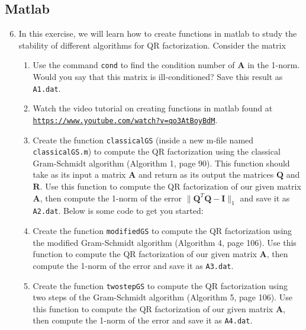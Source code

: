 \documentclass{article}
\begin{document}
\subsection*{Matlab}

\begin{enumerate}\setcounter{enumi}{5}
\item In this exercise, we will learn how to create functions in matlab to study the stability of different algorithms for QR factorization. Consider the matrix
	\begin{enumerate}
\[ \mathbf{A} = \begin{bmatrix} 1 & 1 & 1 & 1 & 1 \\ \epsilon & \epsilon & 0 & 0 & 0 \\ \epsilon & 0 & \epsilon & 0 & 0 \\ \epsilon & 0 & 0 & \epsilon & 0 \\ \epsilon & 0 & 0 & 0 & \epsilon \end{bmatrix} \quad \text{with} \quad \epsilon = 10^{-6}. \]
	\item Use the command {\tt cond} to find the condition number of $\mathbf{A}$ in the 1-norm. Would you say that this matrix is ill-conditioned? Save this result as {\tt A1.dat}.
	\item Watch the video tutorial on creating functions in matlab found at \\ {\tt \href{https://www.youtube.com/watch?v=qo3AtBoyBdM}{https://www.youtube.com/watch?v=qo3AtBoyBdM}}.
	\item Create the function {\tt classicalGS} (inside a new m-file named {\tt classicalGS.m}) to compute the QR factorization using the classical Gram-Schmidt algorithm (Algorithm 1, page 90). This function should take as its input a matrix $\mathbf{A}$ and return as its output the matrices $\mathbf{Q}$ and $\mathbf{R}$. Use this function to compute the QR factorization of our given matrix $\mathbf{A}$, then compute the 1-norm of the error $\| \mathbf{Q}^T\mathbf{Q} - \mathbf{I} \|_1$ and save it as {\tt A2.dat}. Below is some code to get you started:
	\item Create the function {\tt modifiedGS} to compute the QR factorization using the modified Gram-Schmidt algorithm (Algorithm 4, page 106). Use this function to compute the QR factorization of our given matrix $\mathbf{A}$, then compute the 1-norm of the error and save it as {\tt A3.dat}. 
	\item Create the function {\tt twostepGS} to compute the QR factorization using two steps of the Gram-Schmidt algorithm (Algorithm 5, page 106). Use this function to compute the QR factorization of our given matrix $\mathbf{A}$, then compute the 1-norm of the error and save it as {\tt A4.dat}. 

\end{enumerate}
\end{enumerate}
\end{document}
